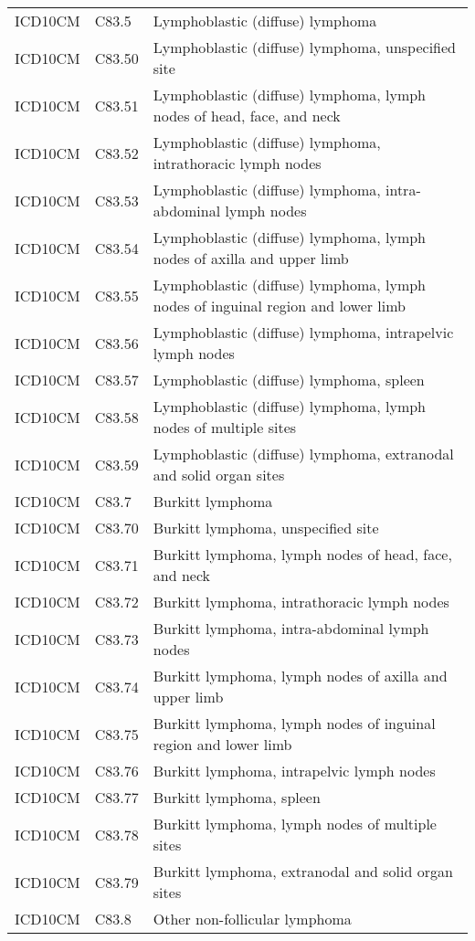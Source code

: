 \begin{table}[ht]
\begin{tabular}{lll}
  ICD10CM & C83.5 & Lymphoblastic (diffuse) lymphoma \\ 
  ICD10CM & C83.50 & Lymphoblastic (diffuse) lymphoma, unspecified site \\ 
  ICD10CM & C83.51 & Lymphoblastic (diffuse) lymphoma, lymph nodes of head, face, and neck \\ 
  ICD10CM & C83.52 & Lymphoblastic (diffuse) lymphoma, intrathoracic lymph nodes \\ 
  ICD10CM & C83.53 & Lymphoblastic (diffuse) lymphoma, intra-abdominal lymph nodes \\ 
  ICD10CM & C83.54 & Lymphoblastic (diffuse) lymphoma, lymph nodes of axilla and upper limb \\ 
  ICD10CM & C83.55 & Lymphoblastic (diffuse) lymphoma, lymph nodes of inguinal region and lower limb \\ 
  ICD10CM & C83.56 & Lymphoblastic (diffuse) lymphoma, intrapelvic lymph nodes \\ 
  ICD10CM & C83.57 & Lymphoblastic (diffuse) lymphoma, spleen \\ 
  ICD10CM & C83.58 & Lymphoblastic (diffuse) lymphoma, lymph nodes of multiple sites \\ 
  ICD10CM & C83.59 & Lymphoblastic (diffuse) lymphoma, extranodal and solid organ sites \\ 
  ICD10CM & C83.7 & Burkitt lymphoma \\ 
  ICD10CM & C83.70 & Burkitt lymphoma, unspecified site \\ 
  ICD10CM & C83.71 & Burkitt lymphoma, lymph nodes of head, face, and neck \\ 
  ICD10CM & C83.72 & Burkitt lymphoma, intrathoracic lymph nodes \\ 
  ICD10CM & C83.73 & Burkitt lymphoma, intra-abdominal lymph nodes \\ 
  ICD10CM & C83.74 & Burkitt lymphoma, lymph nodes of axilla and upper limb \\ 
  ICD10CM & C83.75 & Burkitt lymphoma, lymph nodes of inguinal region and lower limb \\ 
  ICD10CM & C83.76 & Burkitt lymphoma, intrapelvic lymph nodes \\ 
  ICD10CM & C83.77 & Burkitt lymphoma, spleen \\ 
  ICD10CM & C83.78 & Burkitt lymphoma, lymph nodes of multiple sites \\ 
  ICD10CM & C83.79 & Burkitt lymphoma, extranodal and solid organ sites \\ 
  ICD10CM & C83.8 & Other non-follicular lymphoma \\ 

\end{tabular}
\end{table}
